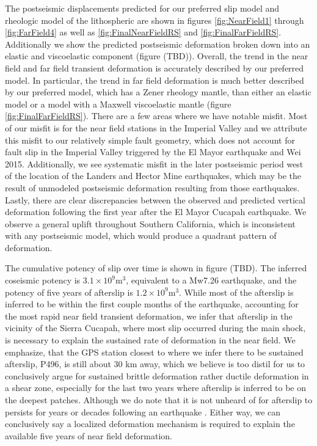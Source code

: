 \documentclass[12pt]{article}
\begin{document}
The postseismic displacements predicted for our preferred slip model and rheologic model of the lithospheric are shown in figures \ref{fig:NearField1} through \ref{fig:FarField4} as well as \ref{fig:FinalNearFieldRS} and \ref{fig:FinalFarFieldRS}.  Additionally we show the predicted postseismic deformation broken down into an elastic and viscoelastic component (figure (TBD)).  Overall, the trend in the near field and far field transient deformation is accurately described by our preferred model.  In particular, the trend in far field deformation is much better described by our preferred model, which has a Zener rheology mantle, than either an elastic model or a model with a Maxwell viscoelastic mantle (figure \ref{fig:FinalFarFieldRS}).  There are a few areas where we have notable misfit.  Most of our misfit is for the near field stations in the Imperial Valley and we attribute this misfit to our relatively simple fault geometry, which does not account for fault slip in the Imperial Valley triggered by the El Mayor earthquake \cite{Wei2011} and Wei 2015.
Additionally, we see systematic misfit in the later postseismic period west of the location of the Landers and Hector Mine earthquakes, which may be the result of unmodeled postseismic deformation resulting from those earthquakes.  Lastly, there are clear discrepancies between the observed and predicted vertical deformation following the first year after the El Mayor Cucapah earthquake. We observe a general uplift throughout Southern California, which is inconsistent with any postseismic model, which would produce a quadrant pattern of deformation.

The cumulative potency of slip over time is shown in figure (TBD). The inferred coseismic potency is $3.1\times10^{9} \mathrm{m}^3$, equivalent to a Mw7.26 earthquake, and the potency of five years of afterslip is $1.2\times10^{9} \mathrm{m}^3$.  While most of the afterslip is inferred to be within the first couple months of the earthquake, accounting for the most rapid near field transient deformation, we infer that afterslip in the vicinity of the Sierra Cucapah, where most slip occurred during the main shock, is necessary to explain the sustained rate of deformation in the near field.  We emphasize, that the GPS station closest to where we infer there to be sustained afterslip, P496, is still about 30 km away, which we believe is too distil for us to conclusively argue for sustained brittle deformation rather ductile deformation in a shear zone, especially for the last two years where afterslip is inferred to be on the deepest patches.    Although we do note that it is not unheard of for afterslip to persists for years or decades following an earthquake \cite{Cakir2012}.  Either way, we can conclusively say a localized deformation mechanism is required to explain the available five years of near field deformation.             
  
\end{document}
